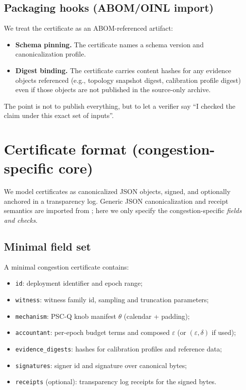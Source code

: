 \documentclass[11pt]{article}
\newcommand{\eps}{\varepsilon}
\begin{document}
\subsection{Packaging hooks (ABOM/OINL import)}
We treat the certificate as an ABOM-referenced artifact:
\begin{itemize}[leftmargin=1.2em]
\item \textbf{Schema pinning.} The certificate names a schema version and canonicalization profile.
\item \textbf{Digest binding.} The certificate carries content hashes for any evidence objects referenced (e.g., topology snapshot digest, calibration profile digest) even if those objects are not published in the source-only archive.
\end{itemize}
The point is not to publish everything, but to let a verifier say ``I checked the claim under this exact set of inputs''.

\section{Certificate format (congestion-specific core)}
We model certificates as canonicalized JSON objects, signed, and optionally anchored in a transparency log.
Generic JSON canonicalization and receipt semantics are imported from \cite{series:release}; here we only specify the congestion-specific \emph{fields and checks}.

\subsection{Minimal field set}
A minimal congestion certificate contains:
\begin{itemize}[leftmargin=1.2em]
\item \texttt{id}: deployment identifier and epoch range;
\item \texttt{witness}: witness family id, sampling and truncation parameters;
\item \texttt{mechanism}: PSC-Q knob manifest $\theta$ (calendar + padding);
\item \texttt{accountant}: per-epoch budget terms and composed $\eps$ (or $(\eps,\delta)$ if used);
\item \texttt{evidence\_digests}: hashes for calibration profiles and reference data;
\item \texttt{signatures}: signer id and signature over canonical bytes;
\item \texttt{receipts} (optional): transparency log receipts for the signed bytes.
\end{itemize}
\end{document}
